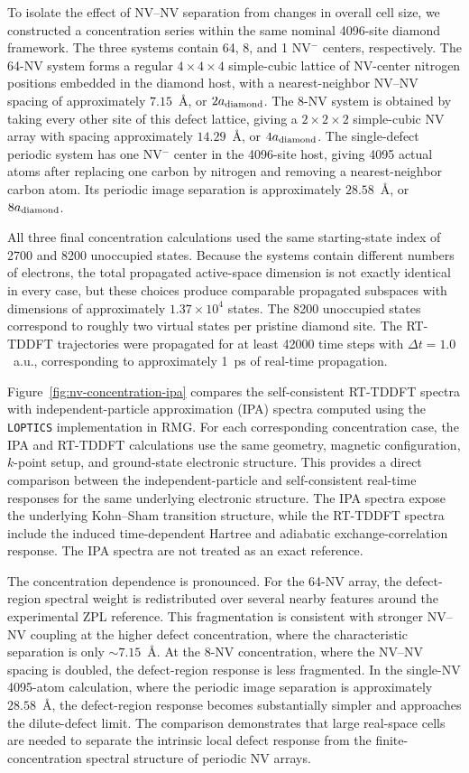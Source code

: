 To isolate the effect of NV--NV separation from changes in overall cell
size, we constructed a concentration series within the same nominal
4096-site diamond framework.  The three systems contain 64, 8, and
1 NV$^{-}$ centers, respectively.  The 64-NV system forms a regular
$4\times4\times4$ simple-cubic lattice of NV-center nitrogen positions
embedded in the diamond host, with a nearest-neighbor NV--NV spacing of
approximately $7.15$~\AA, or $2a_{\rm diamond}$.  The 8-NV system is
obtained by taking every other site of this defect lattice, giving a
$2\times2\times2$ simple-cubic NV array with spacing
approximately $14.29$~\AA, or $4a_{\rm diamond}$.  The single-defect
periodic system has one NV$^{-}$ center in the 4096-site host, giving
4095 actual atoms after replacing one carbon by nitrogen and removing a
nearest-neighbor carbon atom.  Its periodic image separation is
approximately $28.58$~\AA, or $8a_{\rm diamond}$.

All three final concentration calculations used the same starting-state
index of 2700 and 8200 unoccupied states.  Because the systems contain
different numbers of electrons, the total propagated active-space
dimension is not exactly identical in every case, but these choices
produce comparable propagated subspaces with dimensions of approximately
$1.37\times10^4$ states.  The 8200 unoccupied states correspond to
roughly two virtual states per pristine diamond site.  The RT-TDDFT
trajectories were propagated for at least 42000 time steps with
$\Delta t=1.0$~a.u., corresponding to approximately 1~ps of real-time
propagation.

Figure~\ref{fig:nv-concentration-ipa} compares the self-consistent
RT-TDDFT spectra with independent-particle approximation (IPA) spectra
computed using the \texttt{LOPTICS} implementation in RMG.  For each
corresponding concentration case, the IPA and RT-TDDFT calculations use
the same geometry, magnetic configuration, $k$-point setup, and
ground-state electronic structure.  This provides a direct comparison
between the independent-particle and self-consistent real-time
responses for the same underlying electronic structure.  The IPA
spectra expose the underlying Kohn--Sham transition structure, while
the RT-TDDFT spectra include the induced time-dependent Hartree and
adiabatic exchange-correlation response.  The IPA spectra are not
treated as an exact reference.

The concentration dependence is pronounced.  For the 64-NV array, the
defect-region spectral weight is redistributed over several nearby
features around the experimental ZPL reference.  This fragmentation is
consistent with stronger NV--NV coupling at the higher defect
concentration, where the characteristic separation is only
$\sim 7.15$~\AA.  At the 8-NV concentration, where the NV--NV spacing
is doubled, the defect-region response is less fragmented.  In the
single-NV 4095-atom calculation, where the periodic image separation is
approximately $28.58$~\AA, the defect-region response becomes
substantially simpler and approaches the dilute-defect limit.  The
comparison demonstrates that large real-space cells are needed to
separate the intrinsic local defect response from the
finite-concentration spectral structure of periodic NV arrays.

